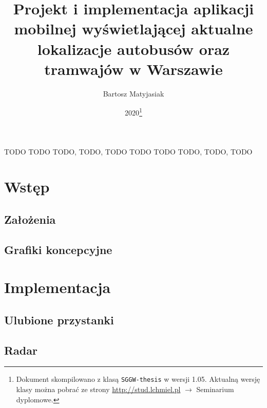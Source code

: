 \documentclass{SGGW-thesis}
\title{Projekt i implementacja aplikacji mobilnej wyświetlającej aktualne lokalizacje autobusów oraz tramwajów w Warszawie}
\author{Bartosz Matyjasiak}
\date{2020\footnote{Dokument skompilowano z klasą {\tt SGGW-thesis} w wersji 1.05. Aktualną wersję klasy można pobrać ze strony \url{http://stud.lchmiel.pl} $\rightarrow$ Seminarium dyplomowe.}}
\begin{document}
\maketitle
\statementpage
\abstractpage
{TODO}
{TODO}
{TODO, TODO, TODO}
{TODO}
{TODO}
{TODO, TODO, TODO}


{
  \doublespacing
  \tableofcontents
}

\startchapterfromoddpage %


\chapter{Wstęp}
\section{Założenia}
\section{Grafiki koncepcyjne}

\chapter{Implementacja}
\section{Ulubione przystanki}

\section{Radar}
\end{document}
